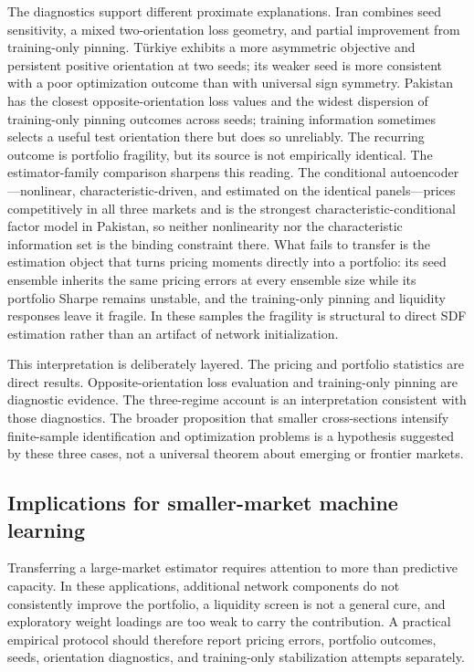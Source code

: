 \documentclass[12pt]{article}
\begin{document}
The diagnostics support different proximate explanations. Iran combines seed sensitivity, a mixed two-orientation loss geometry, and partial improvement from training-only pinning. T\"urkiye exhibits a more asymmetric objective and persistent positive orientation at two seeds; its weaker seed is more consistent with a poor optimization outcome than with universal sign symmetry. Pakistan has the closest opposite-orientation loss values and the widest dispersion of training-only pinning outcomes across seeds; training information sometimes selects a useful test orientation there but does so unreliably. The recurring outcome is portfolio fragility, but its source is not empirically identical. The estimator-family comparison sharpens this reading. The conditional autoencoder---nonlinear, characteristic-driven, and estimated on the identical panels---prices competitively in all three markets and is the strongest characteristic-conditional factor model in Pakistan, so neither nonlinearity nor the characteristic information set is the binding constraint there. What fails to transfer is the estimation object that turns pricing moments directly into a portfolio: its seed ensemble inherits the same pricing errors at every ensemble size while its portfolio Sharpe remains unstable, and the training-only pinning and liquidity responses leave it fragile. In these samples the fragility is structural to direct SDF estimation rather than an artifact of network initialization.

This interpretation is deliberately layered. The pricing and portfolio statistics are direct results. Opposite-orientation loss evaluation and training-only pinning are diagnostic evidence. The three-regime account is an interpretation consistent with those diagnostics. The broader proposition that smaller cross-sections intensify finite-sample identification and optimization problems is a hypothesis suggested by these three cases, not a universal theorem about emerging or frontier markets.

\subsection{Implications for smaller-market machine learning}

Transferring a large-market estimator requires attention to more than predictive capacity. In these applications, additional network components do not consistently improve the portfolio, a liquidity screen is not a general cure, and exploratory weight loadings are too weak to carry the contribution. A practical empirical protocol should therefore report pricing errors, portfolio outcomes, seeds, orientation diagnostics, and training-only stabilization attempts separately.
\end{document}
